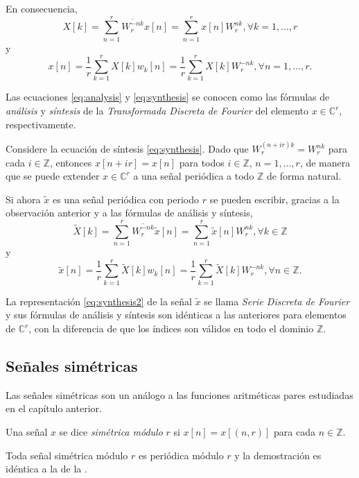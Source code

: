 En consecuencia,
\begin{equation}\label{eq:analysis}
    X[k] = \sum_{n=1}^{r} \overline{W_r^{-n k}} x[n] = \sum_{n=1}^{r} x[n] W_r^{n k}, \forall k=1,\ldots,r
\end{equation}
y
\begin{equation}\label{eq:synthesis}
    x[n] = \frac{1}{r} \sum_{k=1}^{r} X[k] w_k[n] = \frac{1}{r} \sum_{k=1}^{r} X[k] W_r^{- n k}, \forall n=1,\ldots,r.
\end{equation}

Las ecuaciones \eqref{eq:analysis} y \eqref{eq:synthesis} se conocen como las fórmulas de \emph{análisis} y \emph{síntesis} de la \emph{Transformada Discreta de Fourier} del elemento $x \in \mathbb{C}^r$, respectivamente.
\bigskip

Considere la ecuación de síntesis \eqref{eq:synthesis}. Dado que $W_r^{(n + i r) k} = W_r^{n k}$ para cada $i \in \mathbb{Z}$, entonces $x[n + i r] = x[n]$ para todos $i \in \mathbb{Z}$, $n=1,\ldots,r$, de manera que se puede extender $x \in \mathbb{C}^r$ a una señal periódica a todo $\mathbb{Z}$ de forma natural.
\bigskip

Si ahora $\tilde{x}$ es una señal periódica con periodo $r$ se pueden escribir, gracias a la observación anterior y a las fórmulas de análisis y síntesis,
\begin{equation}\label{eq:analysis1}
    \tilde{X}[k] = \sum_{n=1}^{r} \overline{W_r^{-n k}} \tilde{x}[n] = \sum_{n=1}^{r} \tilde{x}[n] W_r^{n k}, \forall k \in \mathbb{Z}
\end{equation}
y
\begin{equation}\label{eq:synthesis2}
    \tilde{x}[n] = \frac{1}{r} \sum_{k=1}^{r} \tilde{X}[k] w_k[n] = \frac{1}{r} \sum_{k=1}^{r} \tilde{X}[k] W_r^{- n k}, \forall n \in \mathbb{Z}.
\end{equation}

La representación \eqref{eq:synthesis2} de la señal $\tilde{x}$ se llama \emph{Serie Discreta de Fourier} y sus fórmulas de análisis y síntesis son idénticas a las anteriores para elementos de $\mathbb{C}^r$, con la diferencia de que los índices son válidos en todo el dominio $\mathbb{Z}$.

\subsection{Señales simétricas}

Las señales simétricas son un análogo a las funciones aritméticas pares estudiadas en el capítulo anterior.

\begin{definition}
Una señal $x$ se dice \emph{simétrica módulo} $r$ si $x[n] = x[(n,r)]$ para cada $n \in \mathbb{Z}$.
\end{definition}

Toda señal simétrica módulo $r$ es periódica módulo $r$ y la demostración es idéntica a la de la .
